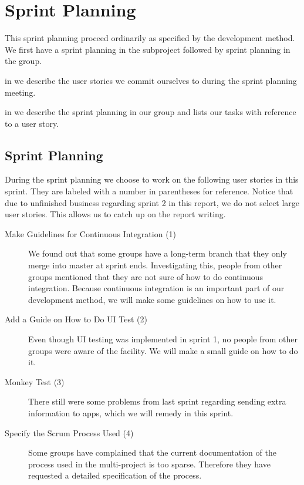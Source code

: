 \chapter{Sprint Planning}\label{chap:s3_sprintplanning}
This sprint planning proceed ordinarily as specified by the development method. We first have a sprint planning in the subproject followed by sprint planning in the group.

\begin{chapterorganization}
  \item in  we describe the user stories we commit ourselves to during the \bd sprint planning meeting.
  \item in  we describe the sprint planning in our group and lists our tasks with reference to a user story.
\end{chapterorganization}

\section{\bdtitle Sprint Planning}\label{sec:S3_bd}
During the \bd sprint planning we choose to work on the following user stories in this sprint. They are labeled with a number in parentheses for reference. Notice that due to unfinished business regarding sprint 2 in this report, we do not select large user stories. This allows us to catch up on the report writing.

\begin{description}
  \item[Make Guidelines for Continuous Integration (1)] We found out that some groups have a long-term branch that they only merge into master at sprint ends. Investigating this, people from other groups mentioned that they are not sure of how to do continuous integration. Because continuous integration is an important part of our development method, we will make some guidelines on how to use it.
  \item[Add a Guide on How to Do UI Test (2)] Even though UI testing was implemented in sprint 1, no people from other groups were aware of the facility. We will make a small guide on how to do it.
  \item[Monkey Test (3)] There still were some problems from last sprint regarding sending extra information to apps, which we will remedy in this sprint.
  \item[Specify the Scrum Process Used (4)] Some groups have complained that the current documentation of the process used in the multi-project is too sparse. Therefore they have requested a detailed specification of the process.
\end{description}

